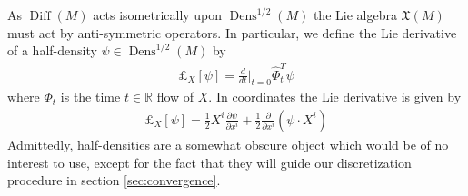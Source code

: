 \documentclass[12pt]{amsart}
\newcommand{\pder}[2]{\ensuremath{\frac{ \partial #1}{\partial #2}}}
\newcommand{\R}{\ensuremath{\mathbb{R}}}
\DeclareMathOperator{\Diff}{Diff}
\DeclareMathOperator{\Dens}{Dens}
\begin{document}
As $\Diff(M)$ acts isometrically upon $\Dens^{1/2}(M)$ the Lie algebra $\mathfrak{X}(M)$ must act by anti-symmetric operators.
In particular, we define the Lie derivative of a half-density $\psi \in \Dens^{1/2}(M)$ by
\begin{align*}
	\pounds_X[ \psi ] = \frac{d}{dt} |_{t=0} \widehat{\Phi}_t^T \psi
\end{align*}
where $\Phi_t$ is the time $t \in \R$ flow of $X$.
In coordinates the Lie derivative is given by
\begin{align*}
	\pounds_X[\psi] = \frac{1}{2} X^i \pder{\psi}{x^i} + \frac{1}{2} \pder{}{x^i} \left(\psi \cdot X^i \right)
\end{align*}
Admittedly, half-densities are a somewhat obscure object which would be of no interest to use, except for the fact that they will guide
our discretization procedure in section \ref{sec:convergence}.

\end{document}
